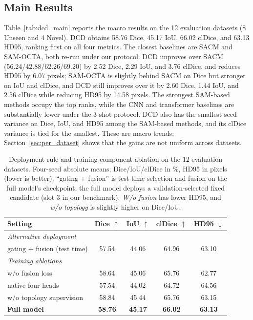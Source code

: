 \subsection{Main Results}
\label{sec:main_results}

Table~\ref{tab:dcd_main} reports the macro results on the 12 evaluation
datasets (8 Unseen and 4 Novel).  DCD obtains 58.76 Dice, 45.17 IoU, 66.02
clDice, and 63.13 HD95, ranking first on all four metrics.  The closest
baselines are SACM and SAM-OCTA, both re-run under our protocol.  DCD
improves over SACM
(56.24/42.88/62.26/69.20) by 2.52 Dice, 2.29 IoU, and 3.76 clDice, and
reduces HD95 by 6.07 pixels; SAM-OCTA is slightly behind SACM on Dice but
stronger on IoU and clDice, and DCD still improves over it by 2.60 Dice,
1.44 IoU, and 2.56 clDice while reducing HD95 by 14.58 pixels.  The strongest SAM-based methods occupy the top ranks, while
the CNN and transformer baselines are substantially lower under the 3-shot
protocol.  DCD also has the smallest seed variance on Dice, IoU, and HD95
among the SAM-based methods, and its clDice variance is tied for the smallest.
These are macro trends: Section~\ref{sec:per_dataset} shows that the gains
are not uniform across datasets.


\begin{table}[!t]
\centering
\caption{Deployment-rule and training-component ablation on the 12
evaluation datasets.  Four-seed absolute means; Dice/IoU/clDice in \%, HD95
in pixels (lower is better).  ``gating + fusion'' is test-time selection
and fusion on the full model's checkpoint; the full model deploys a
validation-selected fixed candidate (slot 3 in our benchmark).  \emph{W/o fusion} has lower HD95, and
\emph{w/o topology} is slightly higher on Dice/IoU.}
\label{tab:dcd_ablation}
\scriptsize
\setlength{\tabcolsep}{2.5pt}
\begin{tabular*}{\columnwidth}{@{\extracolsep{\fill}}lcccc@{}}
\toprule
Setting & Dice $\uparrow$ & IoU $\uparrow$ & clDice $\uparrow$ & HD95 $\downarrow$ \\
\midrule
\multicolumn{5}{l}{\emph{Alternative deployment}}\\
gating + fusion (test time) & 57.54 & 44.06 & 64.96 & 63.10 \\
\midrule
\multicolumn{5}{l}{\emph{Training ablations}}\\
w/o fusion loss & 58.64 & 45.06 & 65.76 & 62.77 \\
native four heads & 57.54 & 44.02 & 64.72 & 64.56 \\
w/o topology supervision & 58.84 & 45.44 & 65.76 & 63.15 \\
\midrule
\textcolor{red!80!black}{\textbf{Full model}} & \textcolor{red!80!black}{\textbf{58.76}} & \textcolor{red!80!black}{\textbf{45.17}} & \textcolor{red!80!black}{\textbf{66.02}} & \textcolor{red!80!black}{\textbf{63.13}} \\
\bottomrule
\end{tabular*}
\end{table}


